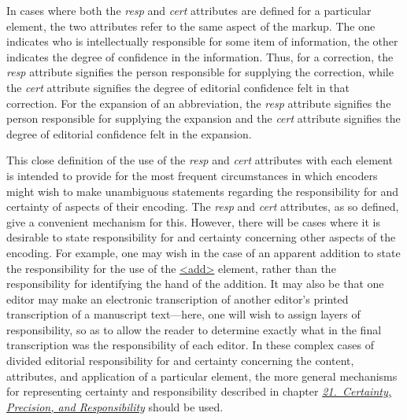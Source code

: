  In cases where both the {\itshape resp} and {\itshape cert} attributes are defined for a particular element, the two attributes refer to the same aspect of the markup. The one indicates who is intellectually responsible for some item of information, the other indicates the degree of confidence in the information. Thus, for a correction, the {\itshape resp} attribute signifies the person responsible for supplying the correction, while the {\itshape cert} attribute signifies the degree of editorial confidence felt in that correction. For the expansion of an abbreviation, the {\itshape resp} attribute signifies the person responsible for supplying the expansion and the {\itshape cert} attribute signifies the degree of editorial confidence felt in the expansion.\par
This close definition of the use of the {\itshape resp} and {\itshape cert} attributes with each element is intended to provide for the most frequent circumstances in which encoders might wish to make unambiguous statements regarding the responsibility for and certainty of aspects of their encoding. The {\itshape resp} and {\itshape cert} attributes, as so defined, give a convenient mechanism for this. However, there will be cases where it is desirable to state responsibility for and certainty concerning other aspects of the encoding. For example, one may wish in the case of an apparent addition to state the responsibility for the use of the \hyperref[TEI.add]{<add>} element, rather than the responsibility for identifying the hand of the addition. It may also be that one editor may make an electronic transcription of another editor's printed transcription of a manuscript text—here, one will wish to assign layers of responsibility, so as to allow the reader to determine exactly what in the final transcription was the responsibility of each editor. In these complex cases of divided editorial responsibility for and certainty concerning the content, attributes, and application of a particular element, the more general mechanisms for representing certainty and responsibility described in chapter \textit{\hyperref[CE]{21.\ Certainty, Precision, and Responsibility}} should be used.\par
